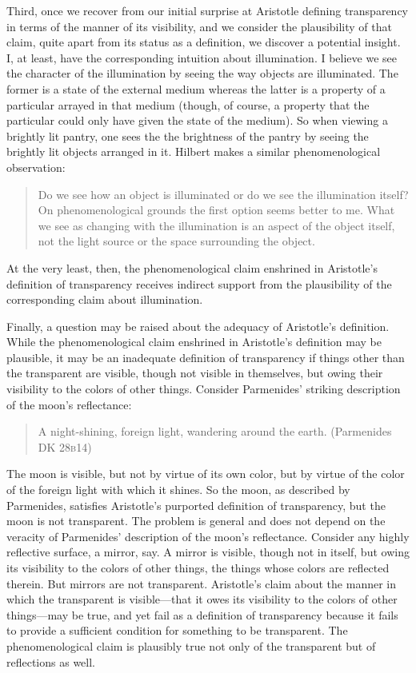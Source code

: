 Third, once we recover from our initial surprise at Aristotle defining transparency in terms of the manner of its visibility, and we consider the plausibility of that claim, quite apart from its status as a definition, we discover a potential insight. I, at least, have the corresponding intuition about illumination. I believe we see the character of the illumination by seeing the way objects are illuminated. The former is a state of the external medium whereas the latter is a property of a particular arrayed in that medium (though, of course, a property that the particular could only have given the state of the medium). So when viewing a brightly lit pantry, one sees the the brightness of the pantry by seeing the brightly lit objects arranged in it.  Hilbert makes a similar phenomenological observation:
\begin{quote}
	Do we see how an object is illuminated or do we see the illumination itself? On phenomenological grounds the first option seems better to me. What we see as changing with the illumination is an aspect of the object itself, not the light source or the space surrounding the object. \citep[150--151]{Hilbert:2007qy}
\end{quote}
At the very least, then, the phenomenological claim enshrined in Aristotle's definition of transparency receives indirect support from the plausibility of the corresponding claim about illumination.

Finally, a question may be raised about the adequacy of Aristotle's definition. While the phenomenological claim enshrined in Aristotle's definition may be plausible, it may be an inadequate definition of transparency if things other than the transparent are visible, though not visible in themselves, but owing their visibility to the colors of other things. Consider Parmenides' striking description of the moon's reflectance:
\begin{quote}
	A night-shining, foreign light, wandering around the earth. (Parmenides DK 28\textsc{b}14)
\end{quote}
The moon is visible, but not by virtue of its own color, but by virtue of the color of the foreign light with which it shines. So the moon, as described by Parmenides, satisfies Aristotle's purported definition of transparency, but the moon is not transparent. The problem is general and does not depend on the veracity of Parmenides' description of the moon's reflectance. Consider any highly reflective surface, a mirror, say. A mirror is visible, though not in itself, but owing its visibility to the colors of other things, the things whose colors are reflected therein. But mirrors are not transparent. Aristotle's claim about the manner in which the transparent is visible---that it owes its visibility to the colors of other things---may be true, and yet fail as a definition of transparency because it fails to provide a sufficient condition for something to be transparent. The phenomenological claim is plausibly true not only of the transparent but of reflections as well.

